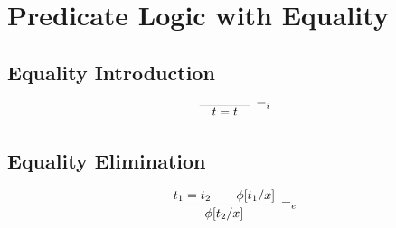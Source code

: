 \documentclass{article}
\newcommand{\rulename}[1]{#1}
\begin{document}
\section*{Predicate Logic with Equality}
  \subsection*{Equality Introduction}
    \begin{align*}
      \infer[\rulename{=_i}]
      {\quad t=t \quad}
      {}
    \end{align*}
  \subsection*{Equality Elimination}
    \begin{align*}
      \infer[\rulename{=_e}]
      {\phi[t_2/x]}
      {t_1 = t_2 && \phi[t_1/x]}
    \end{align*}
\end{document}
